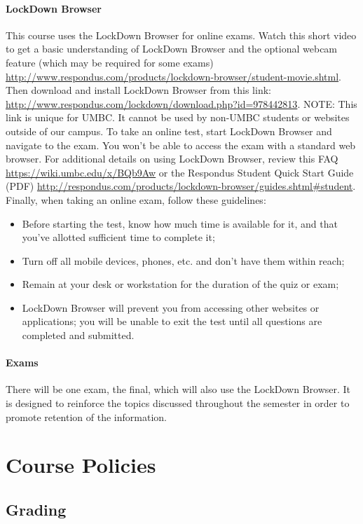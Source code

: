 \documentclass[letter,10pt]{article}
\begin{document}
\paragraph{LockDown Browser}This course uses the LockDown Browser for online exams. Watch this short video to get a basic understanding of LockDown Browser and the optional webcam feature (which may be required for some exams) \url{http://www.respondus.com/products/lockdown-browser/student-movie.shtml}. Then download and install LockDown Browser from this link: \url{http://www.respondus.com/lockdown/download.php?id=978442813}. NOTE: This link is unique for UMBC. It cannot be used by non-UMBC students or websites outside of our campus. To take an online test, start LockDown Browser and navigate to the exam. You won't be able to access the exam with a standard web browser. For additional details on using LockDown Browser, review this FAQ \url{https://wiki.umbc.edu/x/BQb9Aw} or the Respondus Student Quick Start Guide (PDF) \url{http://respondus.com/products/lockdown-browser/guides.shtml#student}. Finally, when taking an online exam, follow these guidelines:
\begin{itemize}
\item Before starting the test, know how much time is available for it, and that you've allotted sufficient time to complete it;
\item Turn off all mobile devices, phones, etc. and don't have them within reach;
\item Remain at your desk or workstation for the duration of the quiz or exam;
\item LockDown Browser will prevent you from accessing other websites or applications; you will be unable to exit the test until all questions are completed and submitted.
\end{itemize}

\paragraph{Exams}There will be one exam, the final, which will also use the LockDown Browser. It is designed to reinforce the topics discussed throughout the semester in order to promote retention of the information.

\section*{Course Policies}
\subsection*{Grading}
\end{document}
